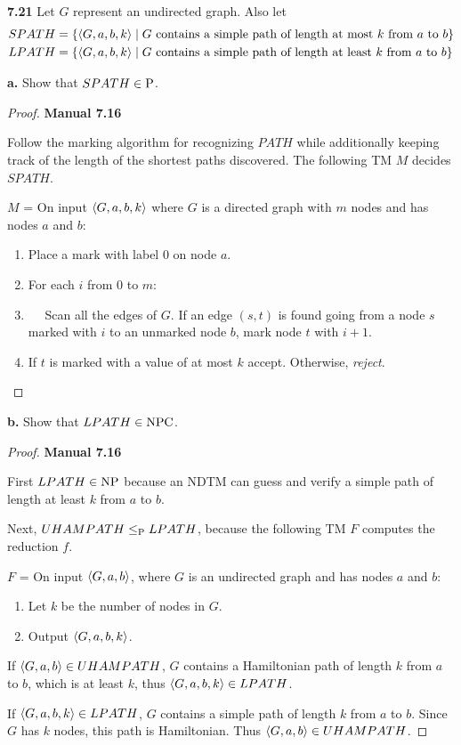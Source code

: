 \textbf{7.21} Let $G$ represent an undirected graph. Also let
\begin{align*}
SPATH &= \{\desc{G, a, b,k} \mid \text{$G$ contains a simple path of length at most $k$ from $a$ to $b$} \} \\
LPATH &= \{\desc{G, a, b,k} \mid \text{$G$ contains a simple path of length at least $k$ from $a$ to $b$} \}
\end{align*}

\label{lang:SPATH_P}
\textbf{a.} Show that $SPATH \in \P$.
\begin{mdframed}
\begin{proof}
\textbf{Manual 7.16}

Follow the marking algorithm for recognizing $PATH$ while additionally keeping track of the length of the shortest paths discovered. The following TM $M$ decides $SPATH$.

\medskip
$M$ = On input $\desc{G, a, b, k}$ where $G$ is a directed graph with $m$ nodes and has nodes $a$ and $b$:
\begin{enumerate}
\item Place a mark with label $0$ on node $a$.
\item For each $i$ from $0$ to $m$:
\item $\quad$ Scan all the edges of $G$. If an edge $(s, t)$ is found going from a node $s$ marked with $i$ to an unmarked node $b$, mark node $t$ with $i+1$.
\item If $t$ is marked with a value of at most $k$ accept. Otherwise, \textit{reject}.
\end{enumerate}
\end{proof}
\end{mdframed}

\label{lang:LPATH_NP}
\label{lang:LPATH_NPC}
\textbf{b.} Show that $LPATH \in \NPC$.
\begin{mdframed}
\begin{proof}
\textbf{Manual 7.16}

First $LPATH \in \NP$ because an NDTM can guess and verify a simple path of length at least $k$ from $a$ to $b$.

Next, $UHAMPATH \leq_\P LPATH$, because the following TM $F$ computes the reduction $f$.

\medskip
$F$ = On input $\desc{G, a, b}$, where $G$ is an undirected graph and has nodes $a$ and $b$:
\begin{enumerate}
\item Let $k$ be the number of nodes in $G$.
\item Output $\desc{G, a, b, k}$.
\end{enumerate}

If $\desc{G, a, b} \in UHAMPATH$, $G$ contains a Hamiltonian path of length $k$ from $a$ to $b$, which is at least $k$, thus $\desc{G, a, b, k} \in LPATH$.

If $\desc{G, a, b, k} \in LPATH$, $G$ contains a simple path of length $k$ from $a$ to $b$. Since $G$ has $k$ nodes, this path is Hamiltonian. Thus $\desc{G, a, b} \in UHAMPATH$.
\end{proof}
\end{mdframed}

